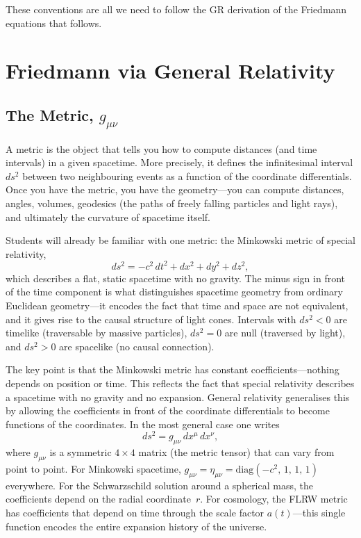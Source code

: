 \medskip
These conventions are all we need to follow the GR derivation of the Friedmann equations that follows.


\section{Friedmann via General Relativity }

\subsection{The Metric, $g_{\mu \nu}$}
A metric is the object that tells you how to compute distances (and time intervals) in a given spacetime. More precisely, it defines the infinitesimal interval $ds^{2}$ between two neighbouring events as a function of the coordinate differentials. Once you have the metric, you have the geometry---you can compute distances, angles, volumes, geodesics (the paths of freely falling particles and light rays), and ultimately the curvature of spacetime itself.

Students will already be familiar with one metric: the Minkowski metric of special relativity,
\begin{equation}
    ds^{2} = -c^{2}\,dt^{2} + dx^{2} + dy^{2} + dz^{2},
    \label{eq:minkowski}
\end{equation}
which describes a flat, static spacetime with no gravity. The minus sign in front of the time component is what distinguishes spacetime geometry from ordinary Euclidean geometry---it encodes the fact that time and space are not equivalent, and it gives rise to the causal structure of light cones. Intervals with $ds^{2}<0$ are timelike (traversable by massive particles), $ds^{2}=0$ are null (traversed by light), and $ds^{2}>0$ are spacelike (no causal connection).

The key point is that the Minkowski metric has constant coefficients---nothing depends on position or time. This reflects the fact that special relativity describes a spacetime with no gravity and no expansion. General relativity generalises this by allowing the coefficients in front of the coordinate differentials to become functions of the coordinates. In the most general case one writes
\begin{equation}
    ds^{2} = g_{\mu\nu}\,dx^{\mu}\,dx^{\nu},
    \label{eq:general_metric}
\end{equation}
where $g_{\mu\nu}$ is a symmetric $4\times 4$ matrix (the metric tensor) that can vary from point to point. For Minkowski spacetime, $g_{\mu\nu} = \eta_{\mu\nu} = \mathrm{diag}(-c^{2},\,1,\,1,\,1)$ everywhere. For the Schwarzschild solution around a spherical mass, the coefficients depend on the radial coordinate~$r$. For cosmology, the FLRW metric has coefficients that depend on time through the scale factor $a(t)$---this single function encodes the entire expansion history of the universe.

